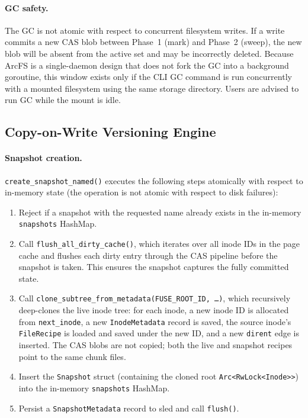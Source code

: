 \documentclass[journal]{IEEEtran}
\begin{document}
\paragraph{GC safety.}
The GC is not atomic with respect to concurrent filesystem writes.
If a write commits a new CAS blob between Phase~1 (mark) and Phase~2
(sweep), the new blob will be absent from the active set and may be
incorrectly deleted.  Because ArcFS is a single-daemon design that
does not fork the GC into a background goroutine, this window exists
only if the CLI GC command is run concurrently with a mounted filesystem
using the same storage directory.  Users are advised to run GC while
the mount is idle.

\subsection{Copy-on-Write Versioning Engine}
\label{sec:cow}

\paragraph{Snapshot creation.}
\texttt{create\_snapshot\_named()} executes the following steps
atomically with respect to in-memory state (the operation is not atomic
with respect to disk failures):
\begin{enumerate}
\item Reject if a snapshot with the requested name already exists in
  the in-memory \texttt{snapshots} HashMap.
\item Call \texttt{flush\_all\_dirty\_cache()}, which iterates over
  all inode IDs in the page cache and flushes each dirty entry through
  the CAS pipeline before the snapshot is taken.  This ensures the
  snapshot captures the fully committed state.
\item Call \texttt{clone\_subtree\_from\_\allowbreak{}metadata(\allowbreak{}FUSE\_ROOT\_ID,\,\ldots)},
  which recursively deep-clones the live inode tree: for each inode,
  a new inode ID is allocated from \texttt{next\_inode}, a new
  \texttt{InodeMetadata} record is saved, the source inode's
  \texttt{FileRecipe} is loaded and saved under the new ID, and a new
  \texttt{dirent} edge is inserted.  The CAS blobs are not copied;
  both the live and snapshot recipes point to the same chunk files.
\item Insert the \texttt{Snapshot} struct (containing the cloned
  root \texttt{Arc\textless{}RwLock\textless{}Inode\textgreater{}\textgreater{}})
  into the in-memory \texttt{snapshots} HashMap.
\item Persist a \texttt{SnapshotMetadata} record to sled and call
  \texttt{flush()}.
\end{enumerate}
\end{document}
